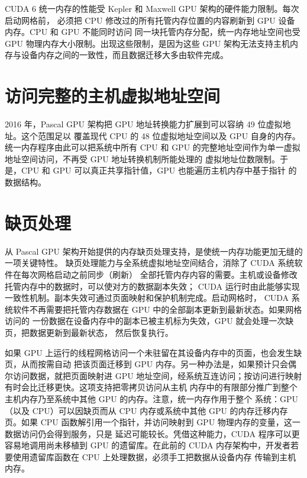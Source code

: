 CUDA 6 统一内存的性能受 Kepler 和 Maxwell GPU 架构的硬件能力限制。每次启动网格前，
必须把 CPU 修改过的所有托管内存位置的内容刷新到 GPU 设备内存。CPU 和 GPU 不能同时访问
同一块托管内存分配，统一内存地址空间也受 GPU 物理内存大小限制。出现这些限制，是因为这些
GPU 架构无法支持主机内存与设备内存之间的一致性，而且数据迁移大多由软件完成。

\section{访问完整的主机虚拟地址空间}
\label{sec:appc-full-host-virtual-address-space}

2016 年，Pascal GPU 架构把 GPU 地址转换能力扩展到可以容纳 49 位虚拟地址。这个范围足以
覆盖现代 CPU 的 48 位虚拟地址空间以及 GPU 自身的内存。统一内存程序由此可以把系统中所有
CPU 和 GPU 的完整地址空间作为单一虚拟地址空间访问，不再受 GPU 地址转换机制所能处理的
虚拟地址位数限制。于是，CPU 和 GPU 可以真正共享指针值，GPU 也能遍历主机内存中基于指针
的数据结构。

\section{缺页处理}
\label{sec:appc-page-fault-handling}

从 Pascal GPU 架构开始提供的内存缺页处理支持，是使统一内存功能更加无缝的一项关键特性。
缺页处理能力与全系统虚拟地址空间结合，消除了 CUDA 系统软件在每次网格启动之前同步（刷新）
全部托管内存内容的需要。主机或设备修改托管内存中的数据时，可以使对方的数据副本失效；
CUDA 运行时由此能够实现一致性机制。副本失效可通过页面映射和保护机制完成。启动网格时，
CUDA 系统软件不再需要把托管内存数据在 GPU 中的全部副本更新到最新状态。如果网格访问的
一份数据在设备内存中的副本已被主机标为失效，GPU 就会处理一次缺页，把数据更新到最新状态，
然后恢复执行。

如果 GPU 上运行的线程网格访问一个未驻留在其设备内存中的页面，也会发生缺页，从而按需自动
把该页面迁移到 GPU 内存。另一种办法是，如果预计只会偶尔访问数据，就把页面映射进 GPU
地址空间，经系统互连访问；按访问进行映射有时会比迁移更快。这项支持把零拷贝访问从主机
内存中的有限部分推广到整个主机内存乃至系统中其他 GPU 的内存。注意，统一内存作用于整个
系统：GPU（以及 CPU）可以因缺页而从 CPU 内存或系统中其他 GPU 的内存迁移内存页。如果
CPU 函数解引用一个指针，并访问映射到 GPU 物理内存的变量，这一数据访问仍会得到服务，只是
延迟可能较长。凭借这种能力，CUDA 程序可以更容易地调用尚未移植到 GPU 的遗留库。在此前的
CUDA 内存架构中，开发者若要使用遗留库函数在 CPU 上处理数据，必须手工把数据从设备内存
传输到主机内存。

